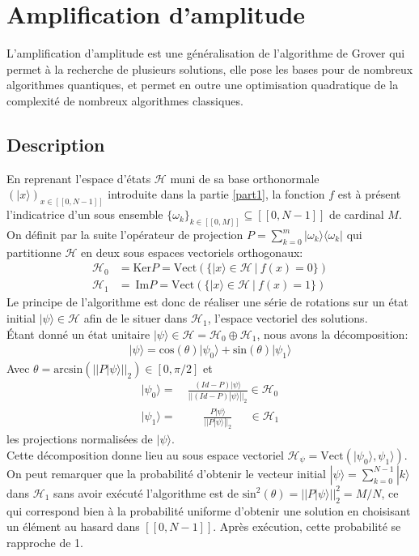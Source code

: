 \section{Amplification d'amplitude}
\label{part2}

L'amplification d'amplitude est une généralisation de l'algorithme de Grover qui permet à la recherche de plusieurs solutions, elle pose les bases pour de nombreux algorithmes quantiques, et permet en outre une optimisation quadratique de la complexité de nombreux algorithmes classiques. \cite{brassard2002quantum}

\subsection{Description}
En reprenant l'espace d'états $\mathcal{H}$ muni de sa base orthonormale $(|x \rangle )_{x \in [\![ 0, N-1 ]\!]}$ introduite dans la partie \ref{part1}, la fonction $f$ est à présent  l'indicatrice d'un sous ensemble $\{ \omega_k \}_{k \in [\![ 0, M ]\!]} \subseteq [\![ 0, N-1 ]\!]$ de cardinal $M$.
On définit par la suite l'opérateur de projection $P=\sum_{k = 0}^m |\omega_k \rangle \langle \omega_k |$ qui partitionne $\mathcal{H}$ en deux sous espaces vectoriels orthogonaux:
\begin{align*}
	\mathcal{H}_0 &= \mathrm{Ker}P = \mathrm{Vect}(\{ |x\rangle \in \mathcal{H} \ | \ f(x) = 0\}) \\
    \mathcal{H}_1 &= \ \mathrm{Im}P = \mathrm{Vect}(\{ |x\rangle \in \mathcal{H} \ | \ f(x) = 1\})    
\end{align*}
Le principe de l'algorithme est donc de réaliser une série de rotations sur un état initial $| \psi \rangle \in \mathcal{H}$ afin de le situer dans $\mathcal{H}_1$, l'espace vectoriel des solutions.
\\
Étant donné un état unitaire $| \psi \rangle \in \mathcal{H} = \mathcal{H}_0 \oplus \mathcal{H}_1$, nous avons la décomposition:
\begin{align*}
    |\psi \rangle = \mathrm{cos}(\theta)| \psi_0 \rangle + \mathrm{sin}(\theta)| \psi_1 \rangle
\end{align*}
Avec $\theta = \mathrm{arcsin}(||P |\psi \rangle||_2) \in [0, \pi / 2]$ et 
\begin{align*}
|\psi_0 \rangle =&\ \frac{(Id-P) |\psi \rangle}{||(Id-P) |\psi \rangle||_2} \in \mathcal{H}_0 \\ 
|\psi_1 \rangle =&\ \quad \ \, \frac{P |\psi \rangle}{||P |\psi \rangle||_2} \quad \ \ \in \mathcal{H}_1
\end{align*}
les projections normalisées de $|\psi \rangle$.
\\
Cette décomposition donne lieu au sous espace vectoriel $\mathcal{H}_{\psi} = \mathrm{Vect}(|\psi_0 \rangle, \psi_1 \rangle)$. 
\\
On peut remarquer que la probabilité d'obtenir le vecteur initial $|\psi \rangle = \sum_{k=0}^{N-1} |k\rangle$ dans $\mathcal{H}_1$ sans avoir exécuté l'algorithme est de $\mathrm{sin}^2(\theta) = ||P |\psi \rangle||_2^2 = M/N$, ce qui correspond bien à la probabilité uniforme d'obtenir une solution en choisisant un élément au hasard dans $[\![ 0, N-1 ]\!]$. Après exécution, cette probabilité se rapproche de 1. 

